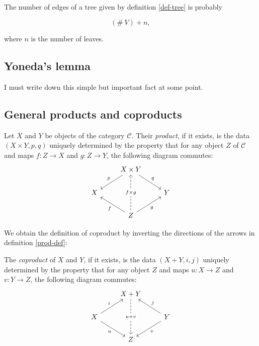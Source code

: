 \documentclass{amsart}
\begin{document}
\subsection{} The number of edges of a tree given by definition
\ref{def-tree} is probably

$$
(\# \ V) + n,
$$

where $n$ is the number of leaves.

\subsection{Yoneda's lemma} I must write down this simple but important
fact at some point.

\subsection{General products and coproducts}

\begin{defn}\label{prod-def}
	Let $X$ and $Y$ be objects of the category $\mathcal{C}$. Their
	\emph{product}, if it exists, is the data $(X \times Y, p, q)$
	uniquely determined by the property that for any object $Z$ of
	$\mathcal{C}$ and maps $f : Z \to X$ and $g : Z \to Y$, the
	following diagram commutes:
	\begin{equation}\label{prod-cd}
		\begin{tikzcd}
			& X \times Y \arrow[ld, "p"'] \arrow[rd, "q"] & \\
			  X &            & Y \\
			  & Z \arrow[lu, "f"] \arrow[ru, "g"']
			      \arrow[uu, dashed, "f \times g" description] & 
		\end{tikzcd}
	\end{equation}
\end{defn}

We obtain the definition of coproduct by inverting the directions of the
arrows in definition \ref{prod-def}:

\begin{defn}\label{coprod-def}
	The \emph{coproduct} of $X$ and $Y$, if it exists, is the data
	$(X + Y, i, j)$ uniquely determined by the property that for any
	object $Z$ and maps $u : X \to Z$ and $v : Y \to Z$, the following
	diagram commutes:
	\begin{equation}\label{coprod-cd}
		\begin{tikzcd}
			& X + Y \arrow[dd, dashed, "u + v" description] &
					\\
			X \arrow[rd, "u"'] \arrow[ru, "i"] & & Y
				\arrow[ld, "v"] \arrow[lu, "j"'] \\
			& Z &
		\end{tikzcd}
	\end{equation}
\end{defn}



\end{document}
